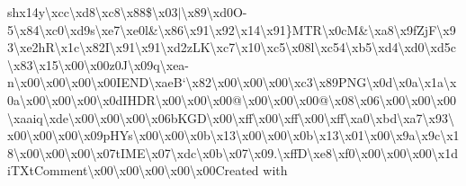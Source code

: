 sh{}x14y\textbackslash{}xcc\textbackslash{}xd8\textbackslash{}xc8\textbackslash{}x88\$\textbackslash{}x03$\vert$\textbackslash{}x89\textbackslash{}xd0\+O-\/5\textbackslash{}x84\textbackslash{}xc0\textbackslash{}xd9s\textbackslash{}xe7\textbackslash{}xe0l\&\textbackslash{}x86\textbackslash{}x91\textbackslash{}x92\textbackslash{}x14\textbackslash{}x91\}\+M\+T\+R\textbackslash{}x0c\+M\&\textbackslash{}xa8\textbackslash{}x9f\+Zj\+F\textbackslash{}x93\textbackslash{}xe2h\+R\textbackslash{}x1c\textbackslash{}x82\+I\textbackslash{}x91\textbackslash{}x91\textbackslash{}xd2z\+L\+K\textbackslash{}xc7\textbackslash{}x10\textbackslash{}xc5\textbackslash{}x08l\textbackslash{}xc54\textbackslash{}xb5\textbackslash{}xd4\textbackslash{}xd0\textbackslash{}xd5c\textbackslash{}x83\textbackslash{}x15\textbackslash{}x00\textbackslash{}x00z0\+J\textbackslash{}x09q\textbackslash{}xea-\/n\textbackslash{}x00\textbackslash{}x00\textbackslash{}x00\textbackslash{}x00\+I\+E\+N\+D\textbackslash{}xae\+B`\textbackslash{}x82\textbackslash{}x00\textbackslash{}x00\textbackslash{}x00\textbackslash{}xc3\textbackslash{}x89\+P\+N\+G\textbackslash{}x0d\textbackslash{}x0a\textbackslash{}x1a\textbackslash{}x0a\textbackslash{}x00\textbackslash{}x00\textbackslash{}x00\textbackslash{}x0d\+I\+H\+D\+R\textbackslash{}x00\textbackslash{}x00\textbackslash{}x00@\textbackslash{}x00\textbackslash{}x00\textbackslash{}x00@\textbackslash{}x08\textbackslash{}x06\textbackslash{}x00\textbackslash{}x00\textbackslash{}x00\textbackslash{}xaaiq\textbackslash{}xde\textbackslash{}x00\textbackslash{}x00\textbackslash{}x00\textbackslash{}x06b\+K\+G\+D\textbackslash{}x00\textbackslash{}xff\textbackslash{}x00\textbackslash{}xff\textbackslash{}x00\textbackslash{}xff\textbackslash{}xa0\textbackslash{}xbd\textbackslash{}xa7\textbackslash{}x93\textbackslash{}x00\textbackslash{}x00\textbackslash{}x00\textbackslash{}x09p\+H\+Ys\textbackslash{}x00\textbackslash{}x00\textbackslash{}x0b\textbackslash{}x13\textbackslash{}x00\textbackslash{}x00\textbackslash{}x0b\textbackslash{}x13\textbackslash{}x01\textbackslash{}x00\textbackslash{}x9a\textbackslash{}x9c\textbackslash{}x18\textbackslash{}x00\textbackslash{}x00\textbackslash{}x00\textbackslash{}x07t\+I\+M\+E\textbackslash{}x07\textbackslash{}xdc\textbackslash{}x0b\textbackslash{}x07\textbackslash{}x09.\textbackslash{}xff\+D\textbackslash{}xe8\textbackslash{}xf0\textbackslash{}x00\textbackslash{}x00\textbackslash{}x00\textbackslash{}x1di\+T\+Xt\+Comment\textbackslash{}x00\textbackslash{}x00\textbackslash{}x00\textbackslash{}x00\textbackslash{}x00\+Created with 